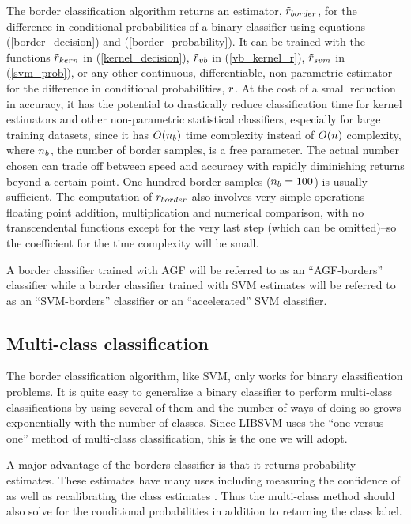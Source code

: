 The border classification algorithm returns an estimator,
$\tilde r_{border}$, for the difference in conditional probabilities of
a binary classifier using
equations (\ref{border_decision}) and (\ref{border_probability}).
It can be trained with the functions $\tilde r_{kern}$ in (\ref{kernel_decision}),
$\tilde r_{vb}$ in (\ref{vb_kernel_r}), $\tilde r_{svm}$ in (\ref{svm_prob}),
or any other 
continuous, differentiable, non-parametric estimator for the difference
in conditional probabilities, $r$.
At the cost of a small reduction in accuracy,
it has the potential to drastically reduce classification time for kernel
estimators and other non-parametric statistical classifiers,
especially for large training datasets,
since it has $O(n_b)$ time complexity instead of $O(n)$
complexity, where $n_b$, the number of border samples, is a free parameter.
The actual number chosen
can trade off between speed and accuracy with rapidly diminishing returns
beyond a certain point. 
One hundred border samples ($n_b=100$) is usually sufficient.
The computation of $\tilde r_{border}$ also involves very simple operations--
floating point addition, multiplication and numerical comparison, with no
transcendental functions except for the very last step (which can be omitted)--so the coefficient for the time complexity will be small.

A border classifier trained with AGF will be referred to as an ``AGF-borders''
classifier while a border classifier trained with SVM estimates will
be referred to as an ``SVM-borders'' classifier or an ``accelerated'' SVM classifier.

\subsection{Multi-class classification}

The border classification algorithm, like SVM, only works for binary 
classification problems. It is quite easy to generalize a binary classifier
to perform multi-class classifications by using several of them and the
number of ways of doing so grows exponentially with the number of classes.
Since LIBSVM uses the ``one-versus-one'' method \citep{Hsu_Lin2002} of 
multi-class classification, this is the one we will adopt. 

A major advantage of the
borders classifier is that it returns probability estimates.
These estimates have many uses including measuring the confidence of as well
as recalibrating the class estimates \citep{Mills2009, Mills2011}.
Thus the multi-class method
should also solve for the conditional probabilities in addition to returning
the class label.

